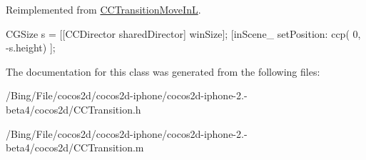 Reimplemented from \hyperlink{interface_c_c_transition_move_in_l_a0cb17195dedf0a4778ede1324068fdaf}{C\-C\-Transition\-Move\-In\-L}.


\begin{DoxyCode}
{
        CGSize s = [[CCDirector sharedDirector] winSize];
        [inScene_ setPosition: ccp( 0, -s.height) ];
}
\end{DoxyCode}


The documentation for this class was generated from the following files\-:\begin{DoxyCompactItemize}
\item 
/\-Bing/\-File/cocos2d/cocos2d-\/iphone/cocos2d-\/iphone-\/2.-\/beta4/cocos2d/C\-C\-Transition.\-h\item 
/\-Bing/\-File/cocos2d/cocos2d-\/iphone/cocos2d-\/iphone-\/2.-\/beta4/cocos2d/C\-C\-Transition.\-m\end{DoxyCompactItemize}
